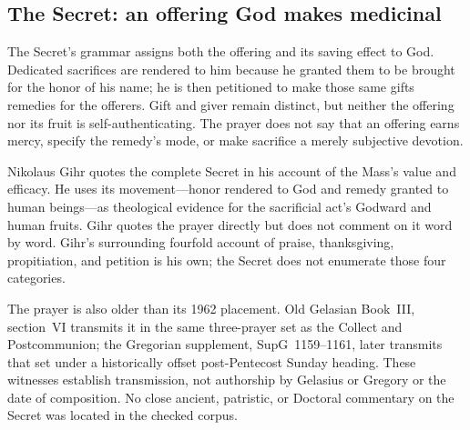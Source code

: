 \subsection*{The Secret: an offering God makes medicinal\enspace{}}

The Secret's grammar assigns both the offering and its saving effect to God.
Dedicated sacrifices are rendered to him because he granted them to be brought
for the honor of his name; he is then petitioned to make those same gifts
remedies for the offerers. Gift and giver remain distinct, but neither the
offering nor its fruit is self-authenticating. The prayer does not say that an
offering earns mercy, specify the remedy's mode, or make sacrifice a merely
subjective devotion.

Nikolaus Gihr quotes the complete Secret in his account of the Mass's value and
efficacy. He uses its movement---honor rendered to God and remedy granted to
human beings---as theological evidence for the sacrificial act's Godward and
human fruits. Gihr quotes the prayer directly but does not comment on it
word by word. Gihr's surrounding fourfold account of praise,
thanksgiving, propitiation, and petition is his own; the Secret does not
enumerate those four categories.

The prayer is also older than its 1962 placement. Old Gelasian Book~III,
section~VI transmits it in the same three-prayer set as the Collect and
Postcommunion; the Gregorian supplement, SupG~1159--1161, later transmits that
set under a historically offset post-Pentecost Sunday heading. These witnesses
establish transmission, not authorship by Gelasius or Gregory or the date of
composition. No close ancient,
patristic, or Doctoral commentary on the Secret was located in the checked
corpus.
